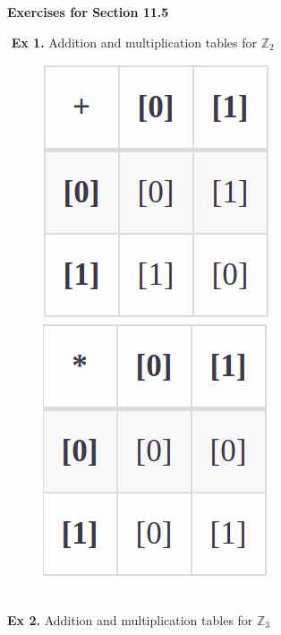 \documentclass{article}
\date{}
\author{}
\begin{document}
\centerline{\textbf{Exercises for Section 11.5}}
$ $\newline
\textbf{Ex 1.} Addition and multiplication tables for $\mathbb{Z}_2$
\begin{figure}[h]
\centering
\includegraphics[scale=0.5]{11_5_1a.png}
\includegraphics[scale=0.5]{11_5_1b.png}
\end{figure}\\
\textbf{Ex 2.} Addition and multiplication tables for $\mathbb{Z}_3$
\end{document}
